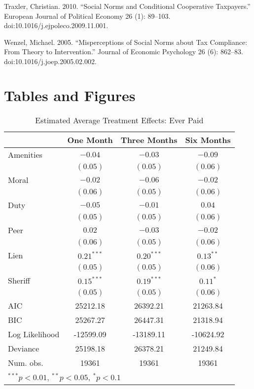 \documentclass[12pt,titlepage]{article}
\begin{document}
Traxler, Christian. 2010. “Social Norms and Conditional Cooperative Taxpayers.” European Journal of Political Economy 26 (1): 89–103. doi:10.1016/j.ejpoleco.2009.11.001.

Wenzel, Michael. 2005. “Misperceptions of Social Norms about Tax Compliance: From Theory to Intervention.” Journal of Economic Psychology 26 (6): 862–83. doi:10.1016/j.joep.2005.02.002.

\section{Tables and Figures}

\begin{table}[htbp]
\caption{Estimated Average Treatment Effects: Ever Paid}
\begin{center}
\begin{tabular}{l c c c }
\hline
               & One Month & Three Months & Six Months \\
\hline
Amenities      & $-0.04$      & $-0.03$      & $-0.09$     \\
               & $(0.05)$     & $(0.05)$     & $(0.06)$    \\
Moral          & $-0.02$      & $-0.06$      & $-0.02$     \\
               & $(0.06)$     & $(0.05)$     & $(0.06)$    \\
Duty           & $-0.05$      & $-0.01$      & $0.04$      \\
               & $(0.05)$     & $(0.05)$     & $(0.06)$    \\
Peer           & $0.02$       & $-0.03$      & $-0.02$     \\
               & $(0.06)$     & $(0.05)$     & $(0.06)$    \\
Lien           & $0.21^{***}$ & $0.20^{***}$ & $0.13^{**}$ \\
               & $(0.05)$     & $(0.05)$     & $(0.06)$    \\
Sheriff        & $0.15^{***}$ & $0.19^{***}$ & $0.11^{*}$  \\
               & $(0.05)$     & $(0.05)$     & $(0.06)$    \\
\hline
AIC            & 25212.18     & 26392.21     & 21263.84    \\
BIC            & 25267.27     & 26447.31     & 21318.94    \\
Log Likelihood & -12599.09    & -13189.11    & -10624.92   \\
Deviance       & 25198.18     & 26378.21     & 21249.84    \\
Num. obs.      & 19361        & 19361        & 19361       \\
\hline
\multicolumn{4}{l}{\scriptsize{$^{***}p<0.01$, $^{**}p<0.05$, $^*p<0.1$}}
\end{tabular}
\label{tbl:reg_ep}
\end{center}
\end{table}
\end{document}
